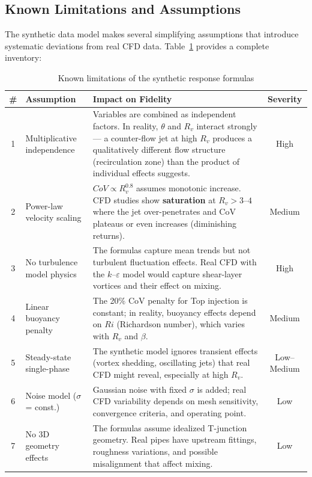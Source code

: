 \documentclass[12pt, a4paper]{report}
\begin{document}
\subsection{Known Limitations and Assumptions}
\label{sec:limitations}

The synthetic data model makes several simplifying assumptions that introduce systematic deviations from real CFD data. Table~\ref{tab:limitations} provides a complete inventory:

\begin{table}[H]
\centering
\caption{Known limitations of the synthetic response formulas}
\label{tab:limitations}
\begin{tabular}{@{}clp{7.5cm}c@{}}
\toprule
\textbf{\#} & \textbf{Assumption} & \textbf{Impact on Fidelity} & \textbf{Severity} \\ \midrule
1 & Multiplicative independence & Variables are combined as independent factors. In reality, $\theta$ and $R_v$ interact strongly --- a counter-flow jet at high $R_v$ produces a qualitatively different flow structure (recirculation zone) than the product of individual effects suggests. & High \\
2 & Power-law velocity scaling & $CoV \propto R_v^{0.8}$ assumes monotonic increase. CFD studies show \textbf{saturation} at $R_v > 3$--$4$ where the jet over-penetrates and CoV plateaus or even increases (diminishing returns). & Medium \\
3 & No turbulence model physics & The formulas capture mean trends but not turbulent fluctuation effects. Real CFD with the $k$--$\varepsilon$ model would capture shear-layer vortices and their effect on mixing. & High \\
4 & Linear buoyancy penalty & The 20\% CoV penalty for Top injection is constant; in reality, buoyancy effects depend on $Ri$ (Richardson number), which varies with $R_v$ and $\beta$. & Medium \\
5 & Steady-state single-phase & The synthetic model ignores transient effects (vortex shedding, oscillating jets) that real CFD might reveal, especially at high $R_v$. & Low--Medium \\
6 & Noise model ($\sigma$ = const.) & Gaussian noise with fixed $\sigma$ is added; real CFD variability depends on mesh sensitivity, convergence criteria, and operating point. & Low \\
7 & No 3D geometry effects & The formulas assume idealized T-junction geometry. Real pipes have upstream fittings, roughness variations, and possible misalignment that affect mixing. & Low \\
\bottomrule
\end{tabular}
\end{table}
\end{document}
